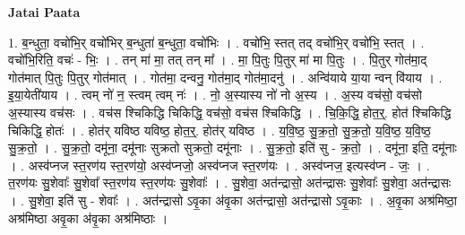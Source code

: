 \documentclass[17pt]{extarticle}
\begin{document}
\textbf{Jatai Paata} \newline

1. ब॒न्धुता॒ वचो॑भि॒र् वचो॑भिर् ब॒न्धुता॑ ब॒न्धुता॒ वचो॑भिः । . वचो॑भि॒ स्तत् तद् वचो॑भि॒र् वचो॑भि॒ स्तत् । . वचो॑भि॒रिति॒ वचः॑ - भिः॒ । . तन् मा॑ मा॒ तत् तन् मा᳚ । . मा॒ पि॒तुः पि॒तुर् मा॑ मा पि॒तुः । . पि॒तुर् गोत॑मा॒द् गोत॑मात् पि॒तुः पि॒तुर् गोत॑मात् । . गोत॑मा॒ दन्वनु॒ गोत॑मा॒द् गोत॑मा॒दनु॑ । . अन्वि॑याये या॒या न्वन् वि॑याय । . इ॒या॒येती॑याय । . त्वम् नो॑ न॒ स्त्वम् त्वम् नः॑ । . नो॒ अ॒स्यास्य नो॑ नो अ॒स्य । . अ॒स्य वच॑सो॒ वच॑सो अ॒स्यास्य वच॑सः । . वच॑स श्चिकिद्धि चिकिद्धि॒ वच॑सो॒ वच॑स श्चिकिद्धि । . चि॒कि॒द्धि॒ होत॒र्॒. होत॑ श्चिकिद्धि चिकिद्धि॒ होतः॑ । . होत॑र् यविष्ठ यविष्ठ॒ होत॒र्॒. होत॑र् यविष्ठ । . य॒वि॒ष्ठ॒ सु॒क्र॒तो॒ सु॒क्र॒तो॒ य॒वि॒ष्ठ॒ य॒वि॒ष्ठ॒ सु॒क्र॒तो॒ । . सु॒क्र॒तो॒ दमू॑ना॒ दमू॑नाः सुक्रतो सुक्रतो॒ दमू॑नाः । . सु॒क्र॒तो॒ इति॑ सु - क्र॒तो॒ । . दमू॑ना॒ इति॒ दमू॑नाः । . अस्व॑प्नज स्त॒रण॑य स्त॒रण॑यो॒ अस्व॑प्नजो॒ अस्व॑प्नज स्त॒रण॑यः । . अस्व॑प्नज॒ इत्यस्व॑प्न - जः॒ । . त॒रण॑यः सु॒शेवाः᳚ सु॒शेवा᳚ स्त॒रण॑य स्त॒रण॑यः सु॒शेवाः᳚ । . सु॒शेवा॒ अत॑न्द्रासो॒ अत॑न्द्रासः सु॒शेवाः᳚ सु॒शेवा॒ अत॑न्द्रासः । . सु॒शेवा॒ इति॑ सु - शेवाः᳚ । . अत॑न्द्रासो ऽवृ॒का अ॑वृ॒का अत॑न्द्रासो॒ अत॑न्द्रासो ऽवृ॒काः । . अ॒वृ॒का अश्र॑मिष्ठा॒ अश्र॑मिष्ठा अवृ॒का अ॑वृ॒का अश्र॑मिष्ठाः । \newline
\end{document}

